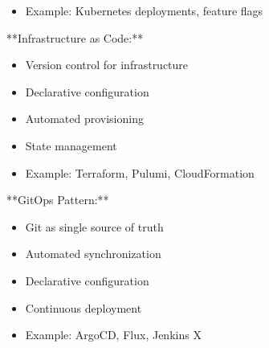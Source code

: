 \documentclass[11pt,a4paper]{article}
\begin{document}
\begin{itemize}
\item Example: Kubernetes deployments, feature flags
\end{itemize}

**Infrastructure as Code:**

\begin{itemize}
\item Version control for infrastructure
\end{itemize}

\begin{itemize}
\item Declarative configuration
\end{itemize}

\begin{itemize}
\item Automated provisioning
\end{itemize}

\begin{itemize}
\item State management
\end{itemize}

\begin{itemize}
\item Example: Terraform, Pulumi, CloudFormation
\end{itemize}

**GitOps Pattern:**

\begin{itemize}
\item Git as single source of truth
\end{itemize}

\begin{itemize}
\item Automated synchronization
\end{itemize}

\begin{itemize}
\item Declarative configuration
\end{itemize}

\begin{itemize}
\item Continuous deployment
\end{itemize}

\begin{itemize}
\item Example: ArgoCD, Flux, Jenkins X
\end{itemize}
\end{document}
